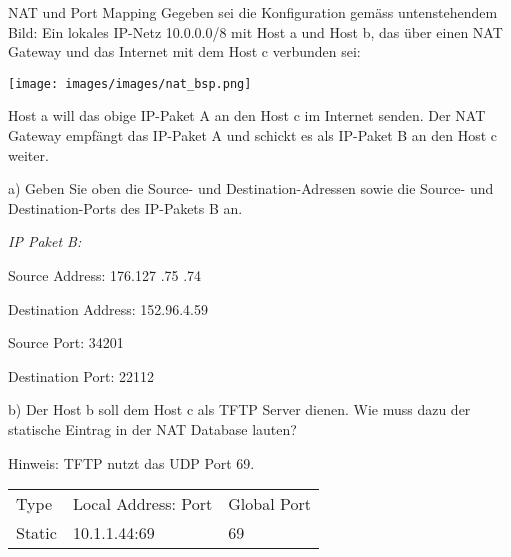 \begin{example2}{NAT und Port Mapping}
Gegeben sei die Konfiguration gemäss untenstehendem Bild: Ein lokales IP-Netz 10.0.0.0/8 mit Host a und Host b, das über einen NAT Gateway und das Internet mit dem Host c verbunden sei:

\texttt{[image: images/images/nat\_bsp.png]}

Host a will das obige IP-Paket A an den Host c im Internet senden. Der NAT Gateway empfängt das IP-Paket A und schickt es als IP-Paket B an den Host c weiter.

a) Geben Sie oben die Source- und Destination-Adressen sowie die Source- und Destination-Ports des IP-Pakets B an.

\emph{IP Paket B:}

Source Address: 176.127 .75 .74

Destination Address: 152.96.4.59

Source Port: 34201

Destination Port: 22112

\vspace{1mm}

b) Der Host b soll dem Host c als TFTP Server dienen. Wie muss dazu der statische Eintrag in der NAT Database lauten? 

Hinweis: TFTP nutzt das UDP Port 69.

\vspace{1mm}

\begin{tabular}{lll} 
Type & Local Address: Port & Global Port \\
Static & 10.1.1.44:69 & 69
\end{tabular}
\end{example2}
